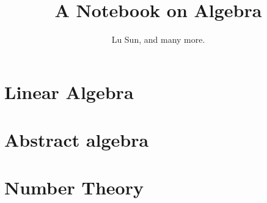 

\makeindex



\frontmatter

\title{A Notebook on Algebra}
\author{Lu Sun, and many more.}

\maketitle


\tableofcontents


\listoffigures
\listoftables

\mainmatter

\part{Linear Algebra}







\part{Abstract algebra}



\part{Number Theory}




\printindex


